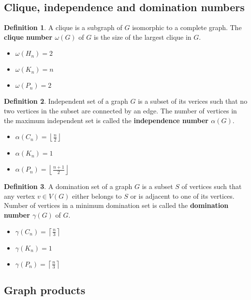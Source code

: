 \documentclass{article}
\theoremstyle{definition}
\newtheorem{dd}{Definition}[section]
\begin{document}
\subsection{Clique, independence and domination numbers}

\begin{dd}
    A clique is a subgraph of $G$ isomorphic to a complete graph. The \textbf{clique number $\omega(G)$} of $G$ is the size of the largest clique in $G$. 
    \begin{itemize}
        \item $\omega(H_n) = 2$
        \item $\omega(K_n) = n$
        \item $\omega(P_n) = 2$
    \end{itemize}
\end{dd}

\begin{dd}
    Independent set of a graph $G$ is a subset of its verices such that no two vertices in the subset are connected by an edge. The number of vertices in the maximum independent set is called the \textbf{independence number $\alpha(G)$}.
    \begin{itemize}
        \item $\alpha(C_n) = \left\lfloor \frac{n}{2} \right\rfloor$
        \item $\alpha(K_n) = 1$
        \item $\alpha(P_n) = \left\lfloor \frac{n + 1}{2} \right\rfloor$
    \end{itemize}
\end{dd}

\begin{dd}
    A domination set of a graph $G$ is a subset $S$ of vertices such that any vertex $v \in V(G)$ either belongs to $S$ or is adjacent to one of its vertices. Number of vertices in a minimum domination set is called the \textbf{domination number $\gamma(G)$} of $G$.
    \begin{itemize}
        \item $\gamma(C_n) = \left\lceil \frac{n}{3} \right\rceil$
        \item $\gamma(K_n) = 1$
        \item $\gamma(P_n) = \left\lceil \frac{n}{3} \right\rceil$
    \end{itemize}
\end{dd}

\subsection{Graph products}
\end{document}
